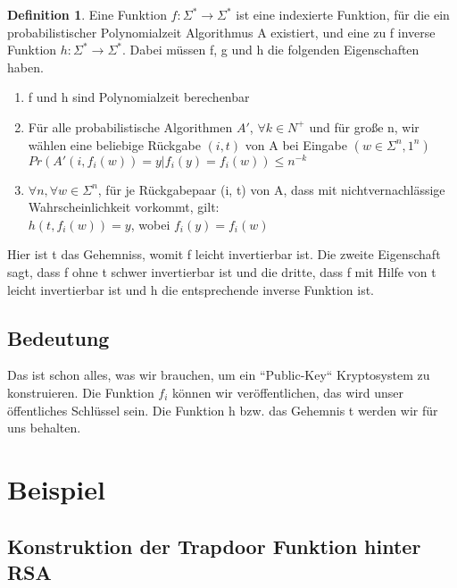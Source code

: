 \documentclass[12pt,a4paper]{article}
\theoremstyle{definition}
\newtheorem{definition}[theorem]{Definition}
\begin{document}
    \begin{definition}
        Eine Funktion $f: \Sigma^* \longrightarrow \Sigma^*$ ist eine indexierte Funktion, für die ein
        probabilistischer Polynomialzeit Algorithmus A
        existiert, und eine zu f inverse Funktion $h: \Sigma^* \longrightarrow \Sigma^*$.
        Dabei müssen f, g und h die folgenden Eigenschaften haben.
        \begin{enumerate}
            \item f und h sind Polynomialzeit berechenbar
            \item Für alle probabilistische Algorithmen $A'$, $\forall k \in N^+$ und für große n, wir wählen eine
            beliebige Rückgabe $(i, t)$ von A bei Eingabe $(w \in \Sigma^n, 1^n)$ \\
            $Pr(A'(i, f_i(w)) = y | f_i(y) = f_i(w)) \leq n^{-k}$
            \item $\forall n, \forall w \in \Sigma^n$, für je Rückgabepaar (i, t) von A, dass mit nichtvernachlässige
            Wahrscheinlichkeit vorkommt, gilt: \\
            $h(t, f_i(w)) = y$, wobei $f_i(y) = f_i(w)$
        \end{enumerate}
    \end{definition}

    Hier ist t das Gehemniss, womit f leicht invertierbar ist. Die zweite Eigenschaft sagt, dass f ohne t schwer
    invertierbar ist und die dritte, dass f mit Hilfe von t leicht invertierbar ist und h die entsprechende
    inverse Funktion ist.

    \subsection{Bedeutung}

    Das ist schon alles, was wir brauchen, um ein ``Public-Key`` Kryptosystem zu konstruieren. Die Funktion $f_i$
    können wir veröffentlichen, das wird unser öffentliches Schlüssel sein. Die Funktion h bzw. das Gehemnis t werden
    wir für uns behalten.

    \section{Beispiel}

    \subsection{Konstruktion der Trapdoor Funktion hinter RSA}
\end{document}
